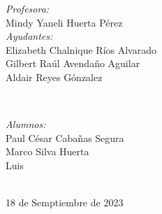 \begin{titlepage}
\vspace{10mm}
\begin{minipage}{0.7\textwidth}
    \begin{flushleft} \large
        \emph{Profesora:}\\
            Mindy Yaneli Huerta Pérez \\
            \vspace{3mm}
            \emph{Ayudantes:}\\
            Elizabeth Chalnique Ríos Alvarado \\
            Gilbert Raúl Avendaño Aguilar \\
            Aldair Reyes Gónzalez
    \end{flushleft}
\end{minipage}
\\
\vspace{20mm}
\begin{minipage}{0.4\textwidth}
    \begin{flushright} \large
    \centering
        \emph{Alumnos:} \\ %
        \vspace{4mm}
        Paul César Cabañas Segura\\
        \vspace{3mm}
        Marco Silva Huerta \\                
        \vspace{3mm}        
        Luis 
    \end{flushright}
\end{minipage}\\[2cm]
\makeatother
{\large 18 de Semptiembre de 2023}\\[2cm]
\vfill 
\end{titlepage}